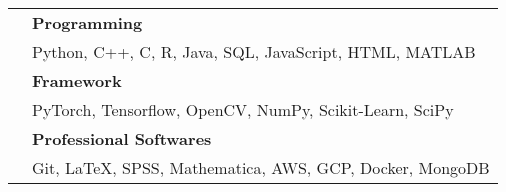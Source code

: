 \documentclass[letterpaper, 11pt]{article}
\begin{document}
\begin{longtable}{p{1.3in}p{4.8in}}

{\color{black}{Skills}} 
& \textbf{Programming}\\
& Python, C++, C, R, Java, SQL, JavaScript, HTML, MATLAB \\
& \textbf{Framework} \\
& PyTorch, Tensorflow, OpenCV, NumPy, Scikit-Learn, SciPy \\
& \textbf{Professional Softwares} \\
& Git, LaTeX, SPSS, Mathematica, AWS, GCP, Docker, MongoDB 
& \\



\end{longtable}
\end{document}
